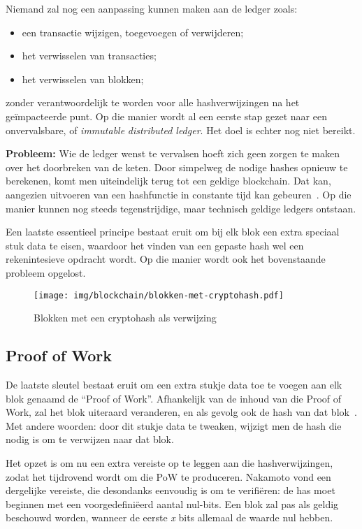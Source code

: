 Niemand zal nog een aanpassing kunnen maken aan de ledger zoals:
\begin{itemize}
	\item een transactie wijzigen, toegevoegen of verwijderen;
	\item het verwisselen van transacties;
	\item het verwisselen van blokken;
\end{itemize}

zonder verantwoordelijk te worden voor alle hashverwijzingen na het geïmpacteerde punt. Op die manier wordt al een eerste stap gezet naar een onvervalsbare, of \textit{immutable} \textit{distributed ledger}. Het doel is echter nog niet bereikt.

\textbf{Probleem:} 
Wie de ledger wenst te vervalsen hoeft zich geen zorgen te maken over het doorbreken van de keten. 
Door simpelweg de nodige hashes opnieuw te berekenen, komt men uiteindelijk terug tot een geldige blockchain. Dat kan, aangezien uitvoeren van een hashfunctie in constante tijd kan gebeuren~\autocite{Slaats2019}. Op die manier kunnen nog steeds tegenstrijdige, maar technisch geldige ledgers ontstaan.

Een laatste essentieel principe bestaat eruit om bij elk blok een extra speciaal stuk data te eisen, waardoor het vinden van een gepaste hash wel een rekenintesieve opdracht wordt. Op die manier wordt ook het bovenstaande probleem opgelost.

\begin{figure}[H]
	\centering
	\texttt{[image: img/blockchain/blokken-met-cryptohash.pdf]}
	\caption{\label{fig:blokken-met-cryptohash}Blokken met een cryptohash als verwijzing}
\end{figure}

\subsection{Proof of Work}
\label{sub:proof-of-work}

De laatste sleutel bestaat eruit om een extra stukje data toe te voegen aan elk blok genaamd de ``Proof of Work''.
Afhankelijk van de inhoud van die Proof of Work, zal het blok uiteraard veranderen, en als gevolg ook de hash van dat blok~\autocite{Nakamoto2008}. Met andere woorden: door dit stukje data te tweaken, wijzigt men de hash die nodig is om te verwijzen naar dat blok.

Het opzet is om nu een extra vereiste op te leggen aan die hashverwijzingen, zodat het tijdrovend wordt om die PoW te produceren. Nakamoto vond een dergelijke vereiste, die desondanks eenvoudig is om te verifiëren: de has moet beginnen met een voorgedefiniëerd aantal nul-bits. Een blok zal pas als geldig beschouwd worden, wanneer de eerste \textit{x} bits allemaal de waarde nul hebben. 

